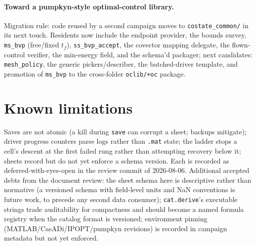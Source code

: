 \documentclass[11pt]{article}
\begin{document}
\paragraph{Toward a pumpkyn-style optimal-control library.} Migration
rule: code reused by a second campaign moves to \texttt{costate\_common/}
in its next touch. Residents now include the endpoint provider, the bounds survey,
\texttt{ms\_bvp} (free/fixed $t_f$), \texttt{ss\_bvp\_accept}, the covector
mapping delegate, the flown-control verifier, the min-energy field, and the
schema'd packager; next candidates: \texttt{mesh\_policy}, the generic
pickers/describer, the batched-driver template, and promotion of
\texttt{ms\_bvp} to the cross-folder \texttt{oclib/+oc} package.

\section{Known limitations}

Saves are not atomic (a kill during \texttt{save} can corrupt a sheet;
backups mitigate); driver progress counters parse logs rather than
\texttt{.mat} state; the ladder stops a cell's descent at the first failed
rung rather than attempting recovery below it; sheets record but do not
yet enforce a schema version. Each is recorded as deferred-with-eyes-open
in the review commit of 2026-08-06. Additional accepted debts from the
document review: the sheet schema here is descriptive rather than
normative (a versioned schema with field-level units and NaN conventions
is future work, to precede any second data consumer);
\texttt{cat.derive}'s executable strings trade auditability for
compactness and should become a named formula registry when the catalog
format is versioned; environment pinning (MATLAB/CasADi/IPOPT/pumpkyn
revisions) is recorded in campaign metadata but not yet enforced.
\end{document}
